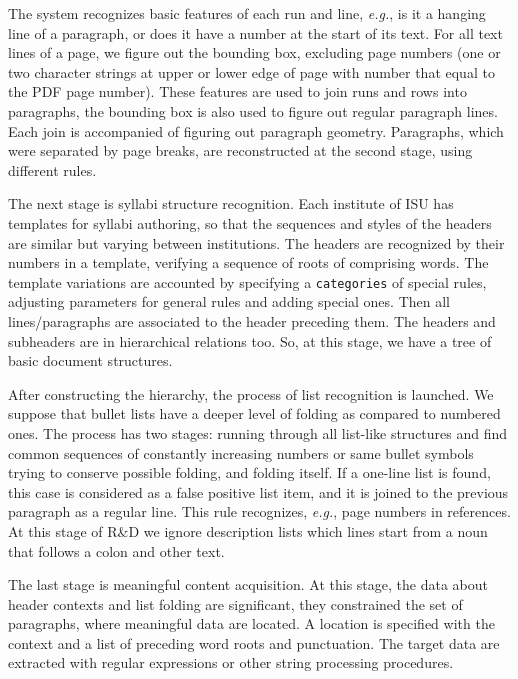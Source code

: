 \documentclass[
]{aiitart}
\begin{document}
The system recognizes basic features of each run and line, \emph{e.g.}, is it a hanging line of a paragraph, or does it have a number at the start of its text.  For all text lines of a page, we figure out the bounding box, excluding page numbers (one or two character strings at upper or lower edge of page with number that equal to the PDF page number). These features are used to join runs and rows into paragraphs, the bounding box is also used to figure out regular paragraph lines.  Each join is accompanied of figuring out paragraph geometry. Paragraphs, which were separated by page breaks, are reconstructed at the second stage, using different rules.

The next stage is syllabi structure recognition.  Each institute of ISU has templates for syllabi authoring, so that the sequences and styles of the headers are similar but varying between institutions.  The headers are recognized by their numbers in a template, verifying a sequence of roots of comprising words.  The template variations are accounted by specifying a \verb|categories| of special rules, adjusting parameters for general rules and adding special ones.  Then all lines/paragraphs are associated to the header preceding them.  The headers and subheaders are in hierarchical relations too.  So, at this stage, we have a tree of basic document structures.

After constructing the hierarchy, the process of list recognition is launched.  We suppose that bullet lists have a deeper level of folding as compared to numbered ones.  The process has two stages: running through all list-like structures and find common sequences of constantly increasing numbers or same bullet symbols trying to conserve possible folding, and folding itself.  If a one-line list is found, this case is considered as a false positive list item, and it is joined to the previous paragraph as a regular line.  This rule recognizes, \emph{e.g.}, page numbers in references.  At this stage of R\&D we ignore description lists which lines start from a noun that follows a colon and other text.

The last stage is meaningful content acquisition.  At this stage, the data about header contexts and list folding are significant, they constrained the set of paragraphs, where meaningful data are located.  A location is specified with the context and a list of preceding word roots and punctuation. The target data are extracted with regular expressions or other string processing procedures.
\end{document}
